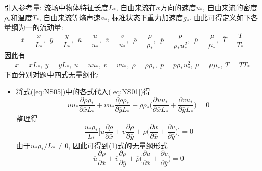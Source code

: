 \begin{solution}
引入参考量: 流场中物体特征长度$L_{*}$, 自由来流在$x$方向的速度$u_{*}$, 自由来流的密度$\rho_{*}$和温度$T_{*}$,
自由来流等熵声速$a_{*}$, 标准状态下重力加速度$g_{*}$. 由此可得定义如下各量纲为一的流动量:
\[
\overline{x}=\frac{x}{L_{*}},~~
\overline{y}=\frac{y}{L_{*}},~~
\overline{u}=\frac{u}{u_{*}},~~
\overline{v}=\frac{v}{u_{*}},~~
\overline{\rho}=\frac{\rho}{\rho_{*}},~~
\overline{p}=\frac{p}{\rho_{*}u_{*}^{2}},~~
\overline{\mu}=\frac{\mu}{\mu_{*}},~~
\overline{T}=\frac{T}{T_{*}}
\]
因此有
\begin{equation}\label{eq:NS05}
x = \overline{x}L_{*},~
y = \overline{y}L_{*},~
u = \overline{u}u_{*},~
v = \overline{v}u_{*},~
\rho =\overline{\rho}\rho_{*},~
p = \overline{p}\rho_{*}u_{*}^{2},~
\mu = \overline{\mu}\mu_{*},~
T=\overline{T}T_{*}
\end{equation}
下面分别对题中四式无量纲化:
\begin{itemize}
\item 将式(\ref{eq:NS05})中的各式代入(\ref{eq:NS01})得
\[
\overline{u}u_{*}\frac{\partial\overline{\rho}\rho_{*}}{\partial\overline{x}L_{*}}+\overline{v}u_{*}\frac{\partial\overline{\rho}\rho_{*}}{\partial\overline{y}L_{*}}+\overline{\rho}\rho_{*}\Big(\frac{\partial\overline{u}u_{*}}{\partial\overline{x}L_{*}}+\frac{\partial\overline{v}u_{*}}{\partial\overline{y}L_{*}}\Big) = 0
\]
整理得
\[
\frac{u_{*}\rho_{*}}{L_{*}}\Big[\overline{u}\frac{\partial\overline{\rho}}{\partial\overline{x}}+\overline{v}\frac{\partial\overline{\rho}}{\partial\overline{y}}+\overline{\rho}\Big(\frac{\partial\overline{u}}{\partial\overline{x}}+\frac{\partial\overline{v}}{\partial\overline{y}}\Big)\Big]=0
\]
由于$u_*\rho_*/L_*\neq 0$, 因此可得到(1)式的无量纲形式
\[
\overline{u}\frac{\partial\overline{\rho}}{\partial\overline{x}}+\overline{v}\frac{\partial\overline{\rho}}{\partial\overline{y}}+\overline{\rho}\Big(\frac{\partial\overline{u}}{\partial\overline{x}}+\frac{\partial\overline{v}}{\partial\overline{y}}\Big)=0
\]


\end{itemize}
\end{solution}

